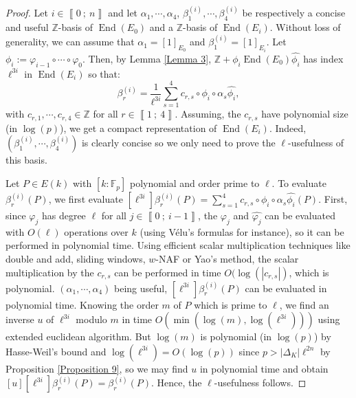\documentclass[a4paper,10pt,notitlepage]{report}
\theoremstyle{definition}
\theoremstyle{plain}
\theoremstyle{definition}
\newcommand{\Z}{\mathbb{Z}}
\newcommand{\F}{\mathbb{F}}
\renewcommand{\i}[2]{\left\llbracket #1~;~#2\right\rrbracket}
\renewcommand{\(}{\left(}
\renewcommand{\)}{\right)}
\DeclareMathOperator{\End}{End}
\begin{document}
\begin{proof}
Let $i\in\i{0}{n}$ and let $\alpha_1,\cdots,\alpha_4$, $\beta_1^{(i)},\cdots,\beta_4^{(i)}$ be respectively a concise and useful $\Z$-basis of $\End(E_0)$ and a $\Z$-basis of $\End(E_i)$. Without loss of generality, we can assume that $\alpha_1=[1]_{E_0}$ and $\beta_1^{(i)}=[1]_{E_i}$. Let $\phi_i:=\varphi_{i-1}\circ\cdots\circ\varphi_0$. Then, by Lemma \ref{Lemma 3}, $\Z+\phi_i\End(E_0)\widehat{\phi_i}$ has index $\ell^{3i}$ in $\End(E_i)$ so that:
\[\beta_r^{(i)}=\frac{1}{\ell^{3i}}\sum_{s=1}^4 c_{r,s}\circ \phi_i\circ \alpha_s\widehat{\phi_i},\]
with $c_{r,1},\cdots,c_{r,4}\in\Z$ for all $r\in\i{1}{4}$.  Assuming, the $c_{r,s}$ have polynomial size (in $\log(p)$), we get a compact representation of $\End(E_i)$. Indeed,  $(\beta_1^{(i)},\cdots,\beta_4^{(i)})$ is clearly concise so we only need to prove the $\ell$-usefulness of this basis. 

Let $P\in E(k)$ with $[k:\F_p]$ polynomial and order prime to $\ell$.  To evaluate $\beta_r^{(i)}(P)$, we first evaluate $[\ell^{3i}]\beta_r^{(i)}(P)=\sum_{s=1}^4 c_{r,s}\circ \phi_i\circ \alpha_s\widehat{\phi_i}(P)$.  First, since $\varphi_j$ has degree $\ell$ for all $j\in\i{0}{i-1}$, the $\varphi_j$ and $\widehat{\varphi_j}$ can be evaluated with $O(\ell)$ operations over $k$ (using V\'{e}lu's formulas \cite{Velu} for instance), so it can be performed in polynomial time.  Using efficient scalar multiplication techniques like double and add,  sliding windows, $w$-NAF or Yao's method, the scalar multiplication by the $c_{r,s}$ can be performed in time $O(\log(|c_{r,s}|)$, which is polynomial. $(\alpha_1,\cdots,\alpha_4)$ being useful, $[\ell^{3i}]\beta_r^{(i)}(P)$ can be evaluated in polynomial time. Knowing the order $m$ of $P$ which is prime to $\ell$, we find an inverse $u$ of $\ell^{3i}$ modulo $m$ in time $O(\min(\log(m),\log(\ell^{3i})))$ using extended euclidean algorithm. But $\log(m)$ is polynomial (in $\log(p)$) by Hasse-Weil's bound and $\log(\ell^{3i})=O(\log(p))$ since $p>|\Delta_K|\ell^{2n}$ by Proposition \ref{Proposition 9}, so we may find $u$ in polynomial time and obtain $[u][\ell^{3i}]\beta_r^{(i)}(P)=\beta_r^{(i)}(P)$.  Hence, the $\ell$-usefulness follows.


\end{proof}
\end{document}
